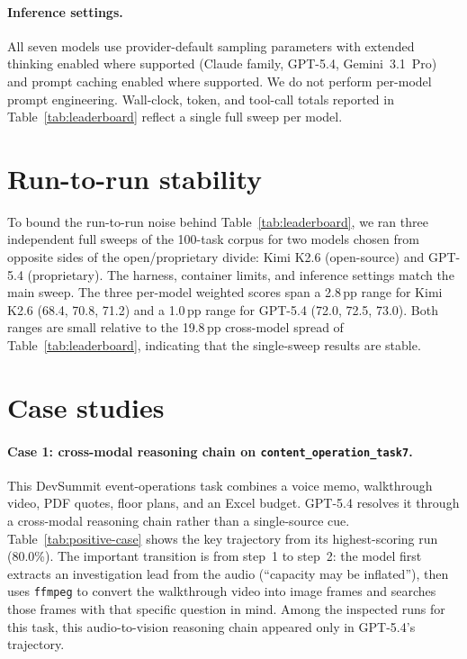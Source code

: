 \paragraph{Inference settings.} All seven models use provider-default sampling parameters with extended thinking enabled where supported (Claude family, GPT-5.4, Gemini~3.1~Pro) and prompt caching enabled where supported. We do not perform per-model prompt engineering. Wall-clock, token, and tool-call totals reported in Table~\ref{tab:leaderboard} reflect a single full sweep per model.

\section{Run-to-run stability}
\label{app:stability}

To bound the run-to-run noise behind Table~\ref{tab:leaderboard}, we ran three independent full sweeps of the 100-task corpus for two models chosen from opposite sides of the open/proprietary divide: Kimi K2.6 (open-source) and GPT-5.4 (proprietary). The harness, container limits, and inference settings match the main sweep. The three per-model weighted scores span a 2.8\,pp range for Kimi K2.6 (68.4, 70.8, 71.2) and a 1.0\,pp range for GPT-5.4 (72.0, 72.5, 73.0). Both ranges are small relative to the 19.8\,pp cross-model spread of Table~\ref{tab:leaderboard}, indicating that the single-sweep results are stable.

\section{Case studies}
\label{app:case-studies}

\paragraph{Case 1: cross-modal reasoning chain on \texttt{content\_operation\_task7}.} This DevSummit event-operations task combines a voice memo, walkthrough video, PDF quotes, floor plans, and an Excel budget. GPT-5.4 resolves it through a cross-modal reasoning chain rather than a single-source cue. Table~\ref{tab:positive-case} shows the key trajectory from its highest-scoring run (80.0\%). The important transition is from step~1 to step~2: the model first extracts an investigation lead from the audio (``capacity may be inflated''), then uses \texttt{ffmpeg} to convert the walkthrough video into image frames and searches those frames with that specific question in mind. Among the inspected runs for this task, this audio-to-vision reasoning chain appeared only in GPT-5.4's trajectory.

